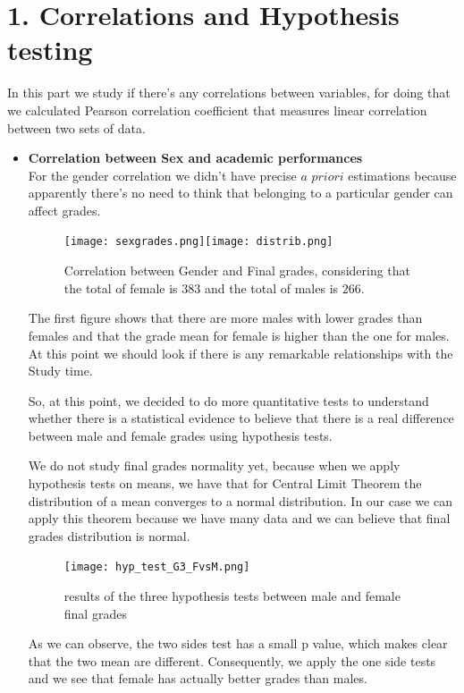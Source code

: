 \documentclass[a4paper, 11pt]{report}
\theoremstyle{definition}
\numberwithin{equation}{section}		%
\numberwithin{figure}{section}			%
\numberwithin{table}{section}				%
\begin{document}
\section*{1. Correlations and Hypothesis testing}
In this part we study if there's any correlations between variables, for doing that we calculated Pearson correlation coefficient that measures linear correlation between two sets of data.

\begin{itemize}
\item \textbf{Correlation between Sex and academic performances}
\\For the gender correlation we didn't have precise $a$ $priori$ estimations because apparently there's no need to think that belonging to a particular gender can affect grades.

\begin{figure}[h]\centering
\texttt{[image: sexgrades.png]}\quad\texttt{[image: distrib.png]}
\caption{Correlation between Gender and Final grades, considering that the total of female is $383$ and the total of males is $266$.}
\end{figure}

The first figure shows that there are more males with lower grades than females and that the grade mean for female is higher than the one for males. At this point we should look if there is any remarkable relationships with the Study time.

So, at this point, we decided to do more quantitative tests to understand
whether there is a statistical evidence to believe that there is a real 
difference between male and female grades using hypothesis tests.

We do not study final grades normality yet, because when we apply hypothesis
tests on means, we have that for Central Limit Theorem the distribution of
a mean converges to a normal distribution. In our case we can apply this theorem because we have many data and we can believe that final grades 
distribution is normal.

\begin{figure}[h]\centering
\texttt{[image: hyp\_test\_G3\_FvsM.png]}
\caption{results of the three hypothesis tests between male and female final grades}
\end{figure}

As we can observe, the two sides test has a small p value, which makes clear
that the two mean are different. Consequently, we apply the one side tests 
and we see that female has actually better grades than males.


\end{itemize}
\end{document}
